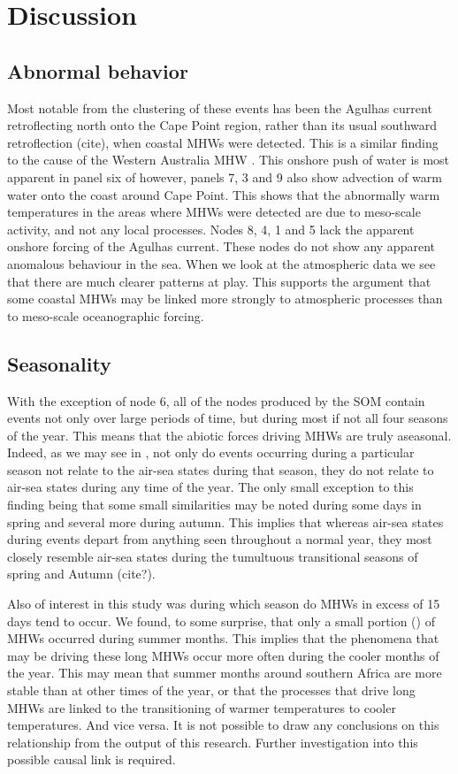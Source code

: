 \documentclass[a4paper,10pt,review]{elsarticle}
\begin{document}
\section{Discussion}
\subsection{Abnormal behavior}
Most notable from the clustering of these events has been the Agulhas current retroflecting north onto the Cape Point region, rather than its usual southward retroflection (cite), when coastal MHWs were detected. This is a similar finding to the cause of the Western Australia MHW \citep{Feng2013, Benthuysen2014}. This onshore push of water is most apparent in panel six of  however, panels 7, 3 and 9 also show advection of warm water onto the coast around Cape Point. This shows that the abnormally warm temperatures in the areas where MHWs were detected are due to meso-scale activity, and not any local processes. Nodes 8, 4, 1 and 5 lack the apparent onshore forcing of the Agulhas current. These nodes do not show any apparent anomalous behaviour in the sea. When we look at the atmospheric data we see that there are much clearer patterns at play. This supports the argument that some coastal MHWs may be linked more strongly to atmospheric processes than to meso-scale oceanographic forcing.

\subsection{Seasonality}
With the exception of node 6, all of the nodes produced by the SOM contain events not only over large periods of time, but during most if not all four seasons of the year. This means  that the abiotic forces driving MHWs are truly aseasonal. Indeed, as we may see in , not only do events occurring during a particular season not relate to the air-sea states during that season, they do not relate to air-sea states during any time of the year. The only small exception to this finding being that some small similarities may be noted during some days in spring and several more during autumn. This implies that whereas air-sea states during events depart from anything seen throughout a normal year, they most closely resemble air-sea states during the tumultuous transitional seasons of spring and Autumn (cite?).

Also of interest in this study was during which season do MHWs in excess of 15 days tend to occur. We found, to some surprise, that only a small portion () of MHWs occurred during summer months. This implies that the phenomena that may be driving these long MHWs occur more often during the cooler months of the year. This may mean that summer months around southern Africa are more stable than at other times of the year, or that the processes that drive long MHWs are linked to the transitioning of warmer temperatures to cooler temperatures. And vice versa. It is not possible to draw any conclusions on this relationship from the output of this research. Further investigation into this possible causal link is required.
\end{document}
